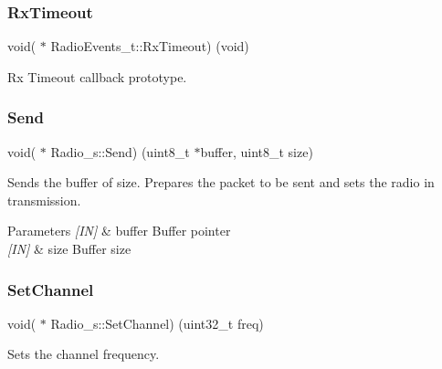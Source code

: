 \mbox{\label{group__LORA_ga1566693134c9ae4bad8a0f90ed72fff2}} 
\subsubsection{\texorpdfstring{Rx\+Timeout}{RxTimeout}}
{\footnotesize\ttfamily void( $\ast$ Radio\+Events\+\_\+t\+::\+Rx\+Timeout) (void)}



Rx Timeout callback prototype. 

\mbox{\label{group__LORA_ga80f05bcd6ec2aea2eec2fc16850c6829}} 
\subsubsection{\texorpdfstring{Send}{Send}}
{\footnotesize\ttfamily void( $\ast$ Radio\+\_\+s\+::\+Send) (uint8\+\_\+t $\ast$buffer, uint8\+\_\+t size)}



Sends the buffer of size. Prepares the packet to be sent and sets the radio in transmission. 


\begin{DoxyParams}{Parameters}
{\em \mbox{[}\+I\+N\mbox{]}} & buffer Buffer pointer \\
\hline
{\em \mbox{[}\+I\+N\mbox{]}} & size Buffer size \\
\hline
\end{DoxyParams}
\mbox{\label{group__LORA_gaf41c78922a5831b2e0ceb458286846fd}} 
\subsubsection{\texorpdfstring{Set\+Channel}{SetChannel}}
{\footnotesize\ttfamily void( $\ast$ Radio\+\_\+s\+::\+Set\+Channel) (uint32\+\_\+t freq)}



Sets the channel frequency. 


